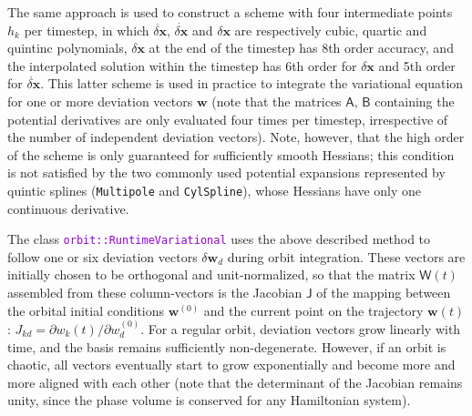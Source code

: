 \documentclass[12pt]{article}
\newcommand{\ttt}[1]{\textcolor{darkviolet}{\texttt{#1}}}
\newcommand{\ppp}[1]{\textcolor{darkolive} {\texttt{#1}}}
\newcommand{\D}{\partial}
\newcommand{\bx}{\boldsymbol{x}}
\begin{document}
The same approach is used to construct a scheme with four intermediate points $h_k$ per timestep, in which $\ddot{\delta\bx}$, $\dot{\delta\bx}$ and $\delta\bx$ are respectively cubic, quartic and quintinc polynomials, $\delta\bx$ at the end of the timestep has 8th order accuracy, and the interpolated solution within the timestep has 6th order for $\delta\bx$ and 5th order for $\dot{\delta\bx}$. This latter scheme is used in practice to integrate the variational equation for one or more deviation vectors $\boldsymbol{w}$ (note that the matrices $\mathsf{A}$, $\mathsf{B}$ containing the potential derivatives are only evaluated four times per timestep, irrespective of the number of independent deviation vectors). Note, however, that the high order of the scheme is only guaranteed for sufficiently smooth Hessians; this condition is not satisfied by the two commonly used potential expansions represented by quintic splines (\ppp{Multipole} and \ppp{CylSpline}), whose Hessians have only one continuous derivative.

The class \ttt{orbit::RuntimeVariational} uses the above described method to follow one or six deviation vectors $\delta\boldsymbol{w}_d$ during orbit integration. These vectors are initially chosen to be orthogonal and unit-normalized, so that the matrix $\mathsf W(t)$ assembled from these column-vectors is the Jacobian $\mathsf J$ of the mapping between the orbital initial conditions $\boldsymbol{w}^{(0)}$ and the current point on the trajectory $\boldsymbol{w}(t)$: $J_{kd} = \D w_k(t) / \D w_d^{(0)}$. For a regular orbit, deviation vectors grow linearly with time, and the basis remains sufficiently non-degenerate. However, if an orbit is chaotic, all vectors eventually start to grow exponentially and become more and more aligned with each other (note that the determinant of the Jacobian remains unity, since the phase volume is conserved for any Hamiltonian system).
\end{document}
